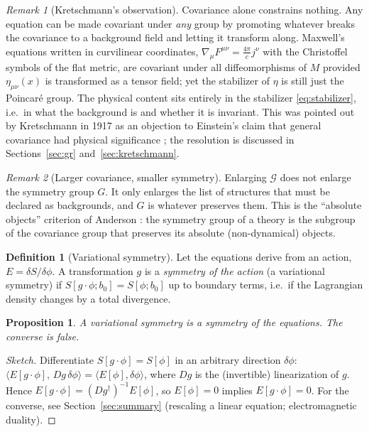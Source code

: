 \documentclass[11pt,a4paper,openany]{book}
\theoremstyle{definition}
\newtheorem{definition}{Definition}[chapter]
\theoremstyle{plain}
\newtheorem{proposition}{Proposition}[chapter]
\theoremstyle{remark}
\newtheorem{remark}{Remark}[chapter]
\begin{document}
\begin{remark}[Kretschmann's observation]\label{rem:kretschmann}
Covariance alone constrains nothing. Any equation can be made covariant under
\emph{any} group by promoting whatever breaks the covariance to a background
field and letting it transform along. Maxwell's equations written in
curvilinear coordinates, $\nabla_\mu F^{\mu\nu}=\tfrac{4\pi}{c}j^\nu$ with
the Christoffel symbols of the flat metric, are covariant under all
diffeomorphisms of $M$ provided $\eta_{\mu\nu}(x)$ is transformed as a
tensor field; yet the stabilizer of $\eta$ is still just the Poincar\'e
group. The physical content sits entirely in the stabilizer \eqref{eq:stabilizer},
i.e.\ in what the background is and whether it is invariant. This was pointed
out by Kretschmann in 1917 as an objection to Einstein's claim that general
covariance had physical significance \cite{kretschmann,norton}; the resolution
is discussed in Sections~\ref{sec:gr} and~\ref{sec:kretschmann}.
\end{remark}

\begin{remark}[Larger covariance, smaller symmetry]\label{rem:smaller}
Enlarging $\mathcal G$ does not enlarge the symmetry group $G$. It only
enlarges the list of structures that must be declared as backgrounds, and $G$
is whatever preserves them. This is the ``absolute objects'' criterion of
Anderson \cite{anderson}: the symmetry group of a theory is the subgroup of
the covariance group that preserves its absolute (non-dynamical) objects.
\end{remark}

\begin{definition}[Variational symmetry]\label{def:variational}
Let the equations derive from an action, $E=\delta S/\delta\phi$. A
transformation $g$ is a \emph{symmetry of the action} (a variational
symmetry) if $S[g\cdot\phi;b_0]=S[\phi;b_0]$ up to boundary terms, i.e.\ if
the Lagrangian density changes by a total divergence.
\end{definition}

\begin{proposition}\label{prop:variational}
A variational symmetry is a symmetry of the equations. The converse is false.
\end{proposition}
\begin{proof}[Sketch]
Differentiate $S[g\cdot\phi]=S[\phi]$ in an arbitrary direction $\delta\phi$:
$\langle E[g\cdot\phi],\,Dg\,\delta\phi\rangle=\langle E[\phi],\delta\phi\rangle$,
where $Dg$ is the (invertible) linearization of $g$. Hence
$E[g\cdot\phi]=(Dg^{\dagger})^{-1}E[\phi]$, so $E[\phi]=0$ implies
$E[g\cdot\phi]=0$. For the converse, see Section~\ref{sec:summary} (rescaling
a linear equation; electromagnetic duality).
\end{proof}
\end{document}
